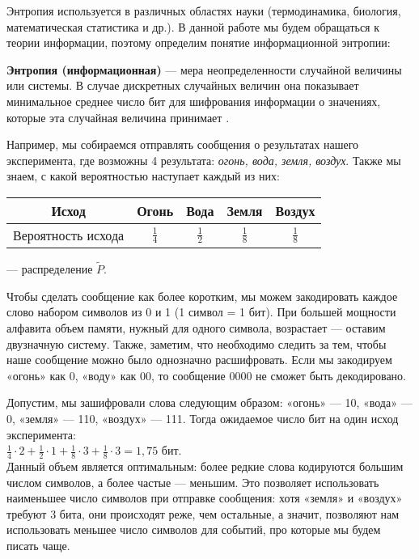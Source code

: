 Энтропия используется в различных областях науки (термодинамика, биология, математическая статистика и др.). В данной работе мы будем обращаться к теории информации, поэтому определим понятие информационной энтропии:

{\bfseries Энтропия (информационная)} --- мера неопределенности случайной величины или системы. В случае дискретных случайных величин она показывает минимальное среднее число бит для шифрования информации о значениях, которые эта случайная величина принимает \cite{entropy}.

Например, мы собираемся отправлять сообщения о результатах нашего эксперимента, где возможны 4 результата: {\itshape огонь, вода, земля, воздух}. Также мы знаем, с какой вероятностью наступает каждый из них:

\begin{center}
\setlength{\extrarowheight}{3mm}
\begin{tabular}{|c|c|c|c|c|}
	\hline
	Исход & Огонь & Вода & Земля & Воздух\\[2mm]
	\hline
	Вероятность исхода & $\displaystyle\frac{1}{4}$ & $\displaystyle\frac{1}{2}$ & $\displaystyle\frac{1}{8}$ & $\displaystyle\frac{1}{8}$\\[3mm]
	\hline
\end{tabular}
\end{center}

--- распределение $\tilde P$.

Чтобы сделать сообщение как более коротким, мы можем закодировать каждое слово набором символов из 0 и 1 (1 символ = 1 бит). При большей мощности алфавита объем памяти, нужный для одного символа, возрастает --- оставим двузначную систему. Также, заметим, что необходимо следить за тем, чтобы наше сообщение можно было однозначно расшифровать. Если мы закодируем «огонь» как 0, «воду» как 00, то сообщение 0000 не сможет быть декодировано.

Допустим, мы зашифровали слова следующим образом: «огонь» --- 10, «вода» --- 0, «земля» --- 110, «воздух» --- 111. Тогда ожидаемое число бит на один исход эксперимента:\\[2mm] $\displaystyle \frac{1}{4} \cdot 2 + \frac{1}{2} \cdot 1 + \frac{1}{8} \cdot 3 + \frac{1}{8} \cdot 3 = 1,75$ бит.
\\[2mm]
\indent Данный объем является оптимальным: более редкие слова кодируются большим числом символов, а более частые --- меньшим. Это позволяет использовать наименьшее число символов при отправке сообщения: хотя «земля» и «воздух» требуют 3 бита, они происходят реже, чем остальные, а значит, позволяют нам использовать меньшее число символов для событий, про которые мы будем писать чаще.

